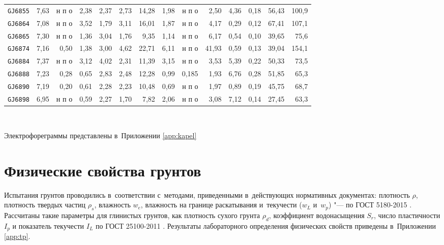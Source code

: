 \begin{table}[]
\begin{tabular}{@{}lrrrrrrrrrrrrr@{}}
    \texttt{GJ6855} & 7,63 & н п о & 2,38 & 2,37 & 2,73 & 14,28 & 1,98 & н п о &  2,50 & 4,36 & 0,18 & 56,43 & 100,9 \\
    \texttt{GJ6864} & 7,08 & н п о & 3,52 & 1,79 & 3,11 & 16,01 & 1,87 & н п о &  4,17 & 0,29 & 0,12 & 67,41 & 107,1 \\
    \texttt{GJ6865} & 7,30 & н п о & 1,36 & 3,04 & 1,76 &  9,35 & 1,14 & н п о &  6,17 & 0,54 & 0,10 & 39,65 &  75,6 \\
    \texttt{GJ6874} & 7,16 & 0,50  & 1,38 & 3,00 & 4,62 & 22,71 & 6,11 & н п о & 41,93 & 0,59 & 0,13 & 39,04 & 154,1 \\
    \texttt{GJ6884} & 7,37 & н п о & 3,12 & 4,02 & 2,31 & 11,39 & 3,15 & н п о &  3,53 & 5,39 & 0,22 & 50,33 &  73,5 \\
    \texttt{GJ6888} & 7,23 & 0,28  & 0,65 & 2,83 & 2,48 & 12,28 & 0,99 & 0,185 &  1,93 & 6,76 & 0,28 & 51,85 &  65,3 \\
    \texttt{GJ6890} & 7,19 & 0,20  & 0,61 & 2,28 & 2,23 & 10,48 & 0,69 & н п о &  1,97 & 0,89 & 0,19 & 45,75 &  68,7 \\
    \texttt{GJ6898} & 6,95 & н п о & 0,59 & 2,27 & 1,70 &  7,82 & 2,06 & н п о &  3,08 & 7,12 & 0,14 & 27,45 &  63,3 \\
    \bottomrule 
    \end{tabular}
    \\ 
\end{table}

Электрофореграммы представлены в~Приложении \ref{app:kapel}


\section{Физические свойства грунтов}

Испытания грунтов проводились в~соответствии с~методами, приведенными в~действующих нормативных документах:
плотность $\rho$, 
плотность твердых частиц $\rho_s$, 
влажность $w_e$, 
влажность на границе раскатывания и~текучести ($w_L$ и~$w_p$) "--- по ГОСТ 5180-2015 \cite{gost5180}. 
Рассчитаны такие параметры для глинистых грунтов, как
плотность сухого грунта $\rho_d$,  
коэффициент водонасыщения $S_r$, 
число пластичности $I_p$ 
и показатель текучести $I_L$ по ГОСТ 25100-2011 \cite{gost25100}.
Результаты лабораторного определения физических свойств приведены в~Приложении \ref{app:tp}.



